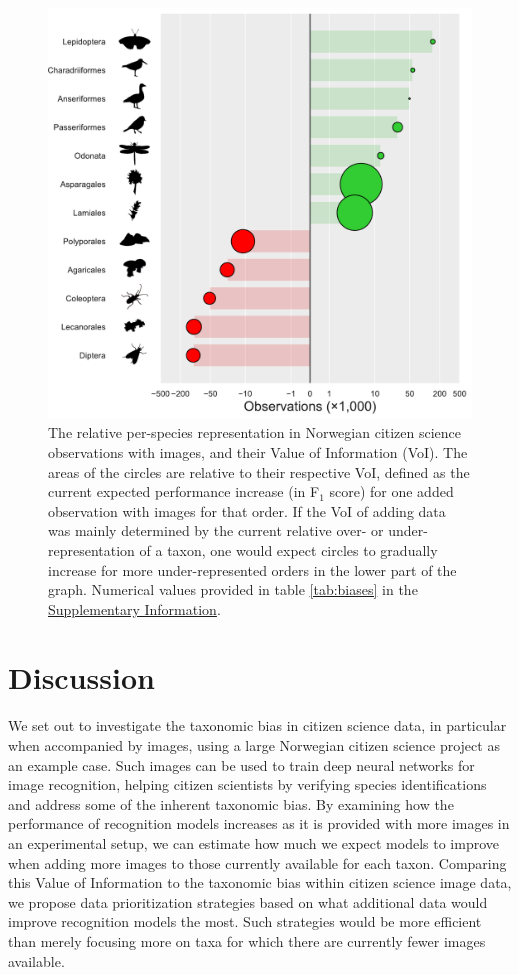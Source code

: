 \documentclass{article}
\begin{document}
\begin{figure}[!ht]
  \includegraphics[width=\textwidth]{4}
  \caption{\footnotesize The relative per-species representation in Norwegian citizen science observations with images, and their Value of Information (VoI). The areas of the circles are relative to their respective VoI, defined as the current expected performance increase (in F\(_1\) score) for one added observation with images for that order. If the VoI of adding data was mainly determined by the current relative over- or under-representation of a taxon, one would expect circles to gradually increase for more under-represented orders in the lower part of the graph. Numerical values provided in table \ref{tab:biases} in the \hyperref[tab:biases]{Supplementary Information}.}
  \label{fig:VoI_vs_bias}
\end{figure}

\section*{Discussion}
We set out to investigate the taxonomic bias in citizen science data, in particular when accompanied by images, using a large Norwegian citizen science project as an example case. Such images can be used to train deep neural networks for image recognition, helping citizen scientists by verifying species identifications and address some of the inherent taxonomic bias. By examining how the performance of recognition models increases as it is provided with more images in an experimental setup, we can estimate how much we expect models to improve when adding more images to those currently available for each taxon. Comparing this Value of Information to the taxonomic bias within citizen science image data, we propose data prioritization strategies based on what additional data would improve recognition models the most. Such strategies would be more efficient than merely focusing more on taxa for which there are currently fewer images available.
\end{document}
